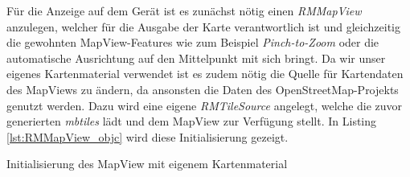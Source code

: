 Für die Anzeige auf dem Gerät ist es zunächst nötig einen \emph{RMMapView} anzulegen, welcher für die Ausgabe der Karte verantwortlich ist und gleichzeitig die gewohnten MapView-Features wie zum Beispiel \emph{Pinch-to-Zoom} oder die automatische Ausrichtung auf den Mittelpunkt mit sich bringt.
Da wir unser eigenes Kartenmaterial verwendet ist es zudem nötig die Quelle für Kartendaten des MapViews zu ändern, da ansonsten die Daten des OpenStreetMap-Projekts genutzt werden. Dazu wird eine eigene \emph{RMTileSource} angelegt, welche die zuvor generierten \emph{mbtiles} lädt und dem MapView zur Verfügung stellt. 
In Listing \ref{lst:RMMapView_objc} wird diese Initialisierung gezeigt.
\begin{listing}[htb!]
    \caption{Initialisierung des MapView mit eigenem Kartenmaterial}
	\label{lst:RMMapView_objc}
\end{listing}